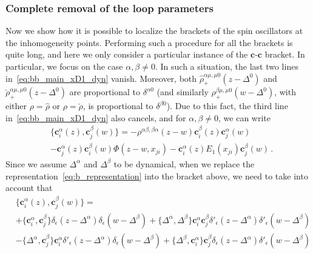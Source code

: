 \subsubsection{Complete removal of the loop parameters}

Now we show how it is possible to localize the brackets of the spin oscillators at the inhomogeneity points. Performing such a procedure for all the brackets is quite long, and here we only consider a particular instance of the $\mathbf{c}$-$\mathbf{c}$ bracket. In particular, we focus on the case $\alpha, \beta \ne 0$.
In such a situation, the last two lines in~\eqref{eq:bb_main_xD1_dyn} vanish.
Moreover, both $\hat{\rho}_+^{\alpha \mu, \mu 0}(z-\Delta^0)$ and $\check{\rho}_+^{\alpha \mu, \mu 0}(z-\Delta^0)$ are proportional to $\delta^{\alpha0}$ (and similarly $\rho_+^{\beta \mu, \mu 0}(w-\Delta^0)$, with either $\rho=\hat{\rho}$ or $\rho=\check{\rho}$, is proportional to $\delta^{\beta0}$). Due to this fact, the third line in~\eqref{eq:bb_main_xD1_dyn} also cancels, and for $\alpha, \beta \ne 0$, we can write 
\begin{equation}
\label{eq:beforeexpansion_bb_Diraceps}
\begin{split}
&\{\mathbf{c}_i^\alpha(z),\mathbf{c}_j^\beta(w)\} =-\rho^{\alpha \beta, \beta \alpha}(z-w)
\mathbf{c}_i^\beta(z) \mathbf{c}_j^\alpha(w) \\
&- \mathbf{c}_j^\alpha(z) \mathbf{c}_i^\beta(w)   \Phi(z-w, x_{ji})   - \mathbf{c}_i^\alpha(z) E_1(x_{ji})    \mathbf{c}_j^\beta(w) \,.
\end{split}
\end{equation}
Since we assume $\Delta^\alpha$ and $\Delta^\beta$ to be dynamical, when we replace the representation~\eqref{eq:b_representation} into the bracket above, we need to take into account that
\begin{equation}
\label{eq:expansion_bb_Diraceps}
\begin{split}
&\{\mathbf{c}_i^\alpha(z),\mathbf{c}_j^\beta(w)\}=\\
&+\{\mathbf{c}_i^\alpha,\mathbf{c}_j^\beta\} \delta_\epsilon(z-\Delta^\alpha) \delta_\epsilon(w-\Delta^\beta)+\{\Delta^\alpha,\Delta^\beta\} \mathbf{c}_i^\alpha \mathbf{c}_j^\beta \delta'_\epsilon(z-\Delta^\alpha) \delta'_\epsilon(w-\Delta^\beta)\\
&-\{\Delta^\alpha ,\mathbf{c}_j^\beta\} \mathbf{c}_i^\alpha \delta'_\epsilon(z-\Delta^\alpha) \delta_\epsilon(w-\Delta^\beta)+\{\Delta^\beta ,\mathbf{c}_i^\alpha\} \mathbf{c}_j^\beta \delta_\epsilon(z-\Delta^\alpha) \delta'_\epsilon(w-\Delta^\beta)
\end{split}
\end{equation}
